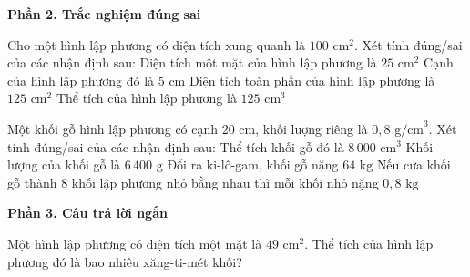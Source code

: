 \textbf{Phần 2. Trắc nghiệm đúng sai}

\begin{ex} %
Cho một hình lập phương có diện tích xung quanh là $100\text{ cm}^2$. Xét tính đúng/sai của các nhận định sau:
\choiceTF
{\True Diện tích một mặt của hình lập phương là $25\text{ cm}^2$}
{\True Cạnh của hình lập phương đó là $5\text{ cm}$}
{Diện tích toàn phần của hình lập phương là $125\text{ cm}^2$}
{\True Thể tích của hình lập phương là $125\text{ cm}^3$}
\end{ex}

\begin{ex} %
Một khối gỗ hình lập phương có cạnh $20\text{ cm}$, khối lượng riêng là $0{,}8\text{ g/cm}^3$. Xét tính đúng/sai của các nhận định sau:
\choiceTF
{\True Thể tích khối gỗ đó là $8\,000\text{ cm}^3$}
{\True Khối lượng của khối gỗ là $6\,400\text{ g}$}
{Đổi ra ki-lô-gam, khối gỗ nặng $64\text{ kg}$}
{\True Nếu cưa khối gỗ thành $8$ khối lập phương nhỏ bằng nhau thì mỗi khối nhỏ nặng $0{,}8\text{ kg}$}
\end{ex}

\textbf{Phần 3. Câu trả lời ngắn}

\begin{ex} %
Một hình lập phương có diện tích một mặt là $49\text{ cm}^2$. Thể tích của hình lập phương đó là bao nhiêu xăng-ti-mét khối?
\end{ex}


